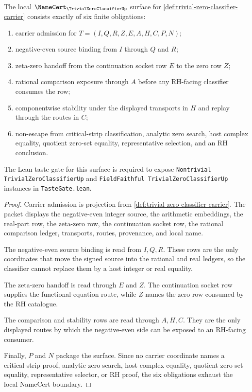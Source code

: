 \begin{theorem}
\label{thm:trivial-zero-classifier-namecert-obligations}
The local $\NameCert_{\TrivialZeroClassifierUp}$ surface for \autoref{def:trivial-zero-classifier-carrier} consists exactly of six finite obligations:
\begin{enumerate}
\item carrier admission for $T=(I,Q,R,Z,E,A,H,C,P,N)$;
\item negative-even source binding from $I$ through $Q$ and $R$;
\item zeta-zero handoff from the continuation socket row $E$ to the zero row $Z$;
\item rational comparison exposure through $A$ before any RH-facing classifier consumes the row;
\item componentwise stability under the displayed transports in $H$ and replay through the routes in $C$;
\item non-escape from critical-strip classification, analytic zero search, host complex equality, quotient zero-set equality, representative selection, and an RH conclusion.
\end{enumerate}
The Lean taste gate for this surface is required to expose \texttt{Nontrivial TrivialZeroClassifierUp} and \texttt{FieldFaithful TrivialZeroClassifierUp} instances in \texttt{TasteGate.lean}.
\end{theorem}
\begin{proof}
Carrier admission is projection from \autoref{def:trivial-zero-classifier-carrier}. The packet displays the negative-even integer source, the arithmetic embeddings, the real-part row, the zeta-zero row, the continuation socket row, the rational comparison ledger, transports, routes, provenance, and local name.

The negative-even source binding is read from $I,Q,R$. These rows are the only coordinates that move the signed source into the rational and real ledgers, so the classifier cannot replace them by a host integer or real equality.

The zeta-zero handoff is read through $E$ and $Z$. The continuation socket row supplies the functional-equation route, while $Z$ names the zero row consumed by the RH catalogue.

The comparison and stability rows are read through $A,H,C$. They are the only displayed routes by which the negative-even side can be exposed to an RH-facing consumer.

Finally, $P$ and $N$ package the surface. Since no carrier coordinate names a critical-strip proof, analytic zero search, host complex equality, quotient zero-set equality, representative selector, or RH proof, the six obligations exhaust the local NameCert boundary.
\end{proof}

